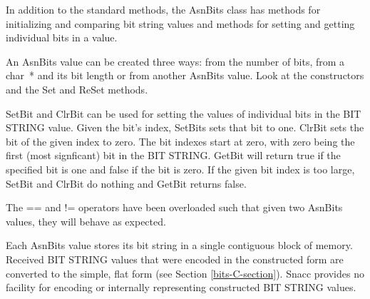 In addition to the standard methods, the {\C AsnBits} class has
methods for initializing and comparing bit string values and methods
for setting and getting individual bits in a value.

An {\C AsnBits} value can be created three ways: from the number of
bits, from a {\C char~*} and its bit length or from another
{\C AsnBits} value.  Look at the constructors and the {\C Set} and
{\C ReSet} methods.

{\C SetBit} and {\C ClrBit} can be used for setting the values of
individual bits in the BIT STRING value.  Given the bit's index,
{\C SetBits} sets that bit to one.  {\C ClrBit} sets the bit
of the given index to zero.  The bit indexes start at zero, with zero
being the first (most signficant) bit in the BIT STRING\@. {\C GetBit}
will return {\C true} if the specified bit is one and {\C false} if the bit is
zero.  If the given bit index is too large, {\C SetBit} and
{\C ClrBit} do nothing and {\C GetBit} returns {\C false}\@.

The {\C ==} and {\C !=} operators have been overloaded such that
given two {\C AsnBits} values, they will behave as expected.

Each {\C AsnBits} value stores its bit string in a single contiguous
block of memory.  Received BIT STRING values that were encoded in the
constructed form are converted to the simple, flat form (see Section
\ref{bits-C-section}).  Snacc provides no facility for encoding or
internally representing constructed BIT STRING values.

